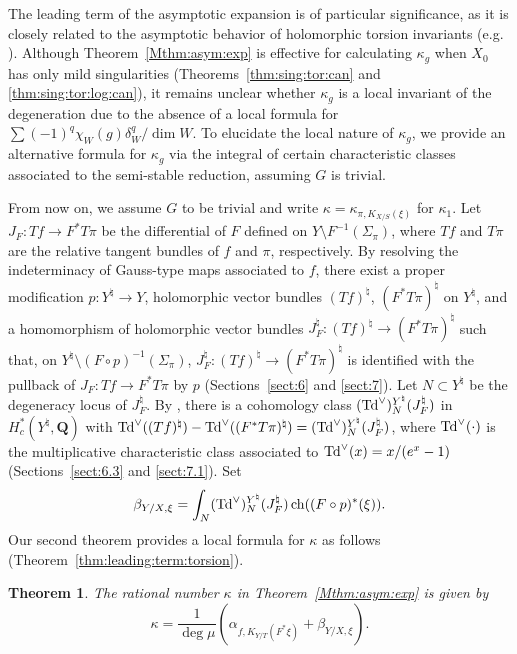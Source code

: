 \documentclass[amscd, leqno]{amsart}
\theoremstyle{plain}
\newtheorem{theorem}{Theorem}[section]
\theoremstyle{definition}
\theoremstyle{remark}
\begin{document}
 
The leading term of the asymptotic expansion is of particular significance, 
as it is closely related to the asymptotic behavior of holomorphic torsion invariants (e.g. \cite{EFM21, FLY08, Imaike24, Yoshikawa04}).
Although Theorem~\ref{Mthm:asym:exp} is effective for calculating $\kappa_{g}$ when $X_{0}$ has only mild singularities
(Theorems~\ref{thm:sing:tor:can} and \ref{thm:sing:tor:log:can}), 
it remains unclear whether $\kappa_{g}$ is a local invariant of the degeneration due to the absence of a local formula for 
$\sum (-1)^{q}\chi_{W}(g)\delta_{W}^{q}/\dim W$. 
To elucidate the local nature of $\kappa_{g}$, we provide an alternative formula for $\kappa_{g}$ via the integral of 
certain characteristic classes associated to the semi-stable reduction, assuming $G$ is trivial. 
\par
From now on, we assume $G$ to be trivial and write $\kappa = \kappa_{\pi, K_{X/S}(\xi)}$ for $\kappa_{1}$.
Let $J_{F} \colon Tf \to F^{*}T\pi$ be the differential of $F$ defined on $Y \setminus F^{-1}(\Sigma_{\pi})$, 
where $Tf$ and $T\pi$ are the relative tangent bundles of $f$ and $\pi$, respectively.
By resolving the indeterminacy of Gauss-type maps associated to $f$, 
there exist a proper modification $p \colon Y^{\natural} \to Y$, 
holomorphic vector bundles $(Tf)^{\natural}$, $(F^{*}T\pi)^{\natural}$ on $Y^{\natural}$, and a homomorphism of holomorphic vector bundles
$J_{F}^{\natural} \colon (Tf)^{\natural} \to (F^{*}T\pi)^{\natural}$ such that, on $Y^{\natural}\setminus (F\circ p)^{-1}(\Sigma_{\pi})$,
$J_{F}^{\natural} \colon (Tf)^{\natural} \to (F^{*}T\pi)^{\natural}$ is identified with the pullback of $J_{F} \colon Tf \to F^{*}T\pi$ by $p$
(Sections~\ref{sect:6} and \ref{sect:7}). 
Let $N \subset Y^{\natural}$ be the degeneracy locus of $J_{F}^{\natural}$.
By \cite{Fulton98}, there is a cohomology class $({\rm Td}^{\lor})^{Y^{\natural}}_{N}( J_{F}^{\natural})$ in 
$H_{c}^{*}(Y^{\natural}, {\mathbf Q})$ with
${\rm Td}^{\lor}( (Tf)^{\natural} ) - {\rm Td}^{\lor}( (F^{*}T\pi)^{\natural} ) = ({\rm Td}^{\lor})^{Y^{\natural}}_{N}( J_{F}^{\natural})$, 
where ${\rm Td}^{\lor}(\cdot)$ is the multiplicative characteristic class associated to ${\rm Td}^{\lor}(x) = x/(e^{x}-1)$ 
(Sections~\ref{sect:6.3} and \ref{sect:7.1}). Set
$$
\beta_{Y/X, \xi} = \int_{N} ({\rm Td}^{\lor})^{Y^{\natural}}_{N}( J_{F}^{\natural} ) \, {\rm ch}((F \circ p)^{*}(\xi)).
$$
Our second theorem provides a local formula for $\kappa$ as follows (Theorem~\ref{thm:leading:term:torsion}).


\begin{theorem}
\label{Mthm:kappa:local}
The rational number $\kappa$ in Theorem~\ref{Mthm:asym:exp} is given by
$$
\kappa = \frac{1}{\deg \mu} ( \alpha_{f,K_{Y/T}(F^{*}\xi)} + \beta_{Y/X, \xi} ).
$$
\end{theorem}
\end{document}
